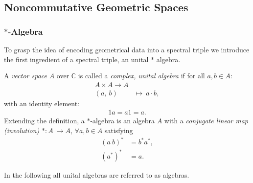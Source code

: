 \subsection{Noncommutative Geometric Spaces\label{sec:1}}
\subsubsection{$*$-Algebra}
To grasp the idea of encoding geometrical data into a spectral triple we
introduce the first ingredient of a spectral triple, an unital $*$ algebra.
\begin{mydefinition}
    A \textit{vector space} $A$ over $\mathbb{C}$ is called a
    \textit{complex, unital algebra} if for all $a,b \in A$:
            \begin{align}
            A \times A \rightarrow A\\
            (a,\ b)\ &\mapsto \ a\cdot b,
            \end{align}
    with an identity element:
            \begin{align}
            1a = a1 =a.
            \end{align}
    Extending the definition, a $*$-algebra is an algebra $A$ with a \textit{conjugate linear map (involution)} $*:A\ \rightarrow  A$,
    $\forall a, b \in A$ satisfying
    \begin{align}
        (a\ b)^* &= b^*a^*,\\
        (a^*)^* &= a.
    \end{align}
\end{mydefinition}
In the following all unital algebras are referred to as algebras.

